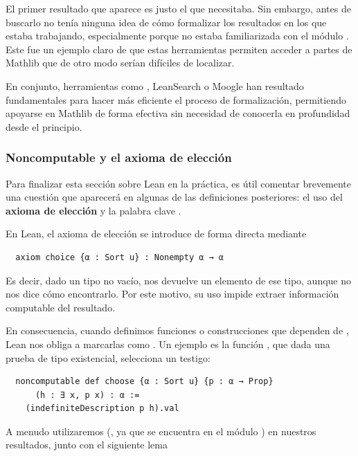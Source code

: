El primer resultado que aparece es justo el que necesitaba. Sin embargo, antes de buscarlo no tenía ninguna idea de cómo formalizar los resultados en los que estaba trabajando, especialmente porque no estaba familiarizada con el módulo . Este fue un ejemplo claro de que estas herramientas permiten acceder a partes de Mathlib que de otro modo serían difíciles de localizar.

En conjunto, herramientas como , LeanSearch o Moogle han resultado fundamentales para hacer más eficiente el proceso de formalización, permitiendo apoyarse en Mathlib de forma efectiva sin necesidad de conocerla en profundidad desde el principio.


\subsubsection{Noncomputable y el axioma de elección}

Para finalizar esta sección sobre Lean en la práctica, es útil comentar brevemente una cuestión que aparecerá en algunas de las definiciones posteriores: el uso del \textbf{axioma de elección} y la palabra clave .

En Lean, el axioma de elección se introduce de forma directa mediante

\begin{lstlisting}
  axiom choice {α : Sort u} : Nonempty α → α
\end{lstlisting}

Es decir, dado un tipo no vacío,  nos devuelve un elemento de ese tipo, aunque no nos dice cómo encontrarlo. Por este motivo, su uso impide extraer información computable del resultado.

En consecuencia, cuando definimos funciones o construcciones que dependen de , Lean nos obliga a marcarlas como .  Un ejemplo es la función , que dada una prueba de tipo existencial, selecciona un testigo:

\begin{lstlisting}
  noncomputable def choose {α : Sort u} {p : α → Prop}
      (h : ∃ x, p x) : α :=
    (indefiniteDescription p h).val
\end{lstlisting}

A menudo utilizaremos  (, ya que se encuentra en el módulo ) en nuestros resultados, junto con el siguiente lema

